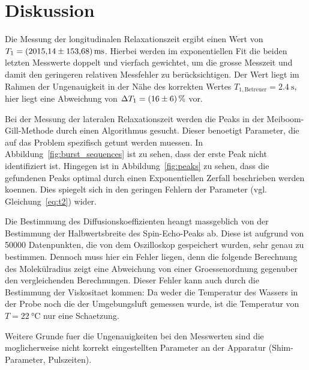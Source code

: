\section{Diskussion}%
\label{sec:diskussion}
Die Messung der longitudinalen Relaxationszeit
ergibt einen Wert von $T_1 = \SI{2015.14 \pm 153.68}{\milli\second}$.
Hierbei werden im exponentiellen Fit die beiden letzten Messwerte doppelt und vierfach gewichtet,
um die grosse Messzeit und damit den geringeren relativen Messfehler zu berücksichtigen.
Der Wert liegt im Rahmen der Ungenauigkeit in der Nähe des korrekten Wertes
$T_{1, \text{Betreuer}} = \SI{2.4}{\second}$\cite{t1betreuer},
hier liegt eine Abweichung von $\Delta T_1 = \SI{16\pm6}{\percent}$ vor.

Bei der Messung der lateralen Relaxationszeit werden die Peaks in der Meiboom-Gill-Methode
durch einen Algorithmus gesucht.
Dieser benoetigt Parameter, die auf das Problem spezifisch getunt werden muessen.
In Abbildung~\ref{fig:burst_sequences} ist zu sehen, dass der erste Peak nicht identifiziert ist.
Hingegen ist in Abbildung~\ref{fig:peaks} zu sehen, dass die gefundenen Peaks
optimal durch einen Exponentiellen Zerfall beschrieben werden koennen.
Dies spiegelt sich in den geringen Fehlern der Parameter (vgl. Gleichung~\eqref{eq:t2}) wider.

Die Bestimmung des Diffusionskoeffizienten heangt massgeblich von der Bestimmung der Halbwertsbreite des
Spin-Echo-Peaks ab.
Diese ist aufgrund von \num{50000} Datenpunkten, die von dem Oszilloskop gespeichert wurden, sehr genau zu bestimmen.
Dennoch muss hier ein Fehler liegen, denn die folgende Berechnung des Molekülradius
zeigt eine Abweichung von einer Groessenordnung gegenuber den vergleichenden Berechnungen.
Dieser Fehler kann auch durch die Bestimmung der Viskositaet kommen:
Da weder die Temperatur des Wassers in der Probe noch die der Umgebungsluft gemessen wurde,
ist die Temperatur von $T = \SI{22}{\celsius}$ nur eine Schaetzung.

Weitere Grunde fuer die Ungenauigkeiten bei den Messwerten sind die 
moglicherweise nicht korrekt eingestellten Parameter an der Apparatur
(Shim-Parameter, Pulszeiten).
